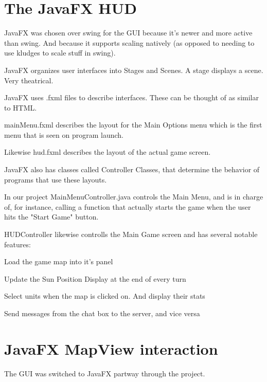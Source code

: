 \documentclass[12pt,a4paper]{article}
\begin{document}
\section{The JavaFX HUD}
JavaFX was chosen over swing for the GUI because it's newer and more active
than swing. And because it supports scaling natively (as opposed to needing to
use kludges to scale stuff in swing).

JavaFX organizes user interfaces into Stages and Scenes. A stage displays a 
scene. Very theatrical.

JavaFX uses .fxml files to describe interfaces. These can be thought of as
similar to HTML.

mainMenu.fxml describes the layout for the Main Options menu which is the first
menu that is seen on program launch.

Likewise hud.fxml describes the layout of the actual game screen.

JavaFX also has classes called Controller Classes, that determine the behavior
of programs that use these layouts.

In our project MainMenuController.java controls the Main Menu, and is in charge
of, for instance, calling a function that actually starts the game when the
user hits the "Start Game" button.

HUDController likewise controlls the Main Game screen and has several notable
features:

\begin{itemize}
\begin{item} Load the game map into it's panel \end{item}
\begin{item} Update the Sun Position Display at the end of every turn \end{item}
\begin{item} Select units when the map is clicked on. And display their stats
\end{item}
\begin{item} Send messages from the chat box to the server, and vice versa
\end{item}
\end{itemize}

\section{JavaFX MapView interaction}
The GUI was switched to JavaFX partway through the project.
\end{document}
